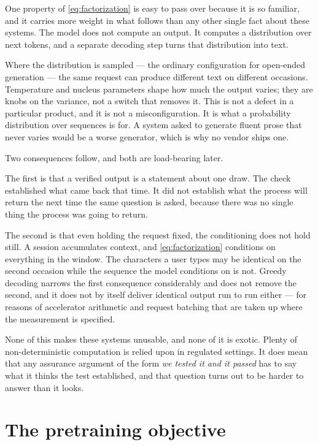 One property of \eqref{eq:factorization} is easy to pass over because it is so
familiar, and it carries more weight in what follows than any other single fact
about these systems. The model does not compute an output. It computes a
distribution over next tokens, and a separate decoding step turns that distribution
into text.

Where the distribution is sampled --- the ordinary configuration for open-ended
generation --- the same request can produce different text on different occasions.
Temperature and nucleus parameters shape how much the output varies; they are knobs
on the variance, not a switch that removes it. This is not a defect in a particular
product, and it is not a misconfiguration. It is what a probability distribution
over sequences is for. A system asked to generate fluent prose that never varies
would be a worse generator, which is why no vendor ships one.

Two consequences follow, and both are load-bearing later.

The first is that a verified output is a statement about one draw. The check
established what came back that time. It did not establish what the process will
return the next time the same question is asked, because there was no single thing
the process was going to return.

The second is that even holding the request fixed, the conditioning does not hold
still. A session accumulates context, and \eqref{eq:factorization} conditions on
everything in the window. The characters a user types may be identical on the second
occasion while the sequence the model conditions on is not. Greedy decoding narrows
the first consequence considerably and does not remove the second, and it does not
by itself deliver identical output run to run either --- for reasons of accelerator
arithmetic and request batching that are taken up where the measurement is
specified.

None of this makes these systems unusable, and none of it is exotic. Plenty of
non-deterministic computation is relied upon in regulated settings. It does mean
that any assurance argument of the form \emph{we tested it and it passed} has to say
what it thinks the test established, and that question turns out to be harder to
answer than it looks.

\section{The pretraining objective}
\label{sec:pretraining}

